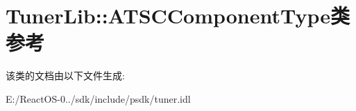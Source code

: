 \hypertarget{class_tuner_lib_1_1_a_t_s_c_component_type}{}\section{Tuner\+Lib\+:\+:A\+T\+S\+C\+Component\+Type类 参考}
\label{class_tuner_lib_1_1_a_t_s_c_component_type}


该类的文档由以下文件生成\+:\begin{DoxyCompactItemize}
\item 
E\+:/\+React\+O\+S-\/0../sdk/include/psdk/tuner.\+idl\end{DoxyCompactItemize}
